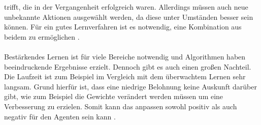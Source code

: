 trifft, die in der Vergangenheit erfolgreich waren. Allerdings müssen auch neue unbekannte Aktionen ausgewählt werden, da diese unter Umständen besser sein können. Für ein gutes Lernverfahren ist es notwendig, eine Kombination aus beidem zu ermöglichen \cite{sutton2018reinforcement}.
\\\\
Bestärkendes Lernen ist für viele Bereiche notwendig und Algorithmen haben beeindruckende Ergebnisse erzielt. Dennoch gibt es auch einen großen Nachteil. Die Laufzeit ist zum Beispiel im Vergleich mit dem überwachtem Lernen sehr langsam. Grund hierfür ist, dass eine niedrige Belohnung keine Auskunft darüber gibt, wie zum Beispiel die Gewichte verändert werden müssen um eine Verbesserung zu erzielen. Somit kann das anpassen sowohl positiv als auch negativ für den Agenten sein kann \cite{zell2003simulation}. 


